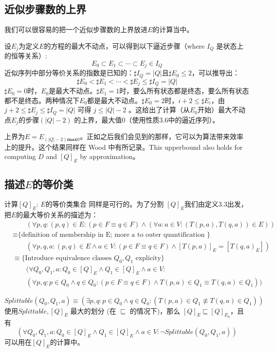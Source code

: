 \subsection{近似步骤数的上界}
我们可以很容易的把一个近似步骤数的上界放进$E$的计算当中。

设$E_j$为定义$E$的方程的最大不动点，可以得到以下逼近步骤（where $I_Q$ 是状态上的恒等关系）:
$$ E_0 \subset E_1 \subset \cdots \subset E_j \in I_Q $$
近似序列中部分等价关系的指数是已知的：$\sharp I_Q = |Q| \mbox{且} \sharp E_0 \leq 2$，可以推导出：
$$ \sharp E_0 < \sharp E_1 < \cdots < \sharp E_j \leq \sharp I_Q = |Q| $$
$\sharp E_0=0$时，$E_0$是最大不动点。$\sharp E_1=1$时，要么所有状态都是终态，要么所有状态都不是终态。两种情况下$E_0$都是最大不动点。$\sharp E_0=2$时，$i+2 \leq \sharp E_i$，由 $ j+2 \leq \sharp E_j \leq \sharp I_Q = |Q| $ 可得 $j \leq |Q|-2 $ 。这给出了计算（从$E_0$开始）最大不动点$E_j$的步骤$(|Q|-2)$ 的上界，最大值0（使用性质3.6中的逼近序列）。

上界为$E=E_{(|Q|-2)\textbf{max} 0}$。正如之后我们会见到的那样，它可以为算法带来效率上的提升。这个结果同样在 Wood \cite[引理  2.4.1]{Wood87} 中有所记录。This upperbound also holds for computing $D$ and $[Q]_E$ by approximation。


\subsection{描述$E$的等价类}

计算$[Q]_E$: $E$的等价类集合 同样是可行的。为了分割 $[Q]_E$我们由定义3.3出发，把$E$的最大等价关系的描述为：
\begin{equation*}
    \begin{split}
        & \mbox{　　}(\forall p,q : (p,q) \in E : ( p \in F \equiv q \in F ) \land ( \forall a:a \in V : (T(p,a),T(q,a)) \in E )) \\
        & \equiv \mbox{\{ definition of membership in E; more a to outer quantification \} }\\
        & \mbox{　　}(\forall p,q,a:(p,q)\in E \land a\in V : (p \in F \equiv q \in F) \land [T(p,a)]_E = [T(q,a)_E]) \\
        & \equiv \mbox{\{ Introduce equivalence classes } Q_0,Q_1\mbox{ explicity\} } \\
        & \mbox{　　}(\forall Q_0,Q_1,a:Q_0\in [Q]_E \land Q_1 \in [Q]_E \land a \in V : \\
        & \mbox{　　}(\forall p,q:p\in Q_0 \land q\in Q_0 : (p \in F \equiv q \in F) \land T(p,a) \in Q_1 \equiv T(q,a) \in Q_1))
    \end{split}
\end{equation*}
\newline

$$ Splittable(Q_0,Q_1,a) \equiv (\exists p,q:p\in Q_0 \land q\in Q_0 : (T(p,a) \in Q_1 \not\equiv T(q,a) \in Q_1)) $$
使用$Splittable,[Q]_E$ 最大的划分 (在 $\sqsubseteq$ 的情况下)，那么 $[Q]_E \sqsubseteq [Q]_{E_0}$，且有
$$ (\forall Q_0,Q_1,a:Q_0 \in [Q]_E \land Q_1 \in [Q]_E \land a \in V : \neg Splittable(Q_0,Q_1,a)) $$
可以用在$[Q]_E$的计算中。